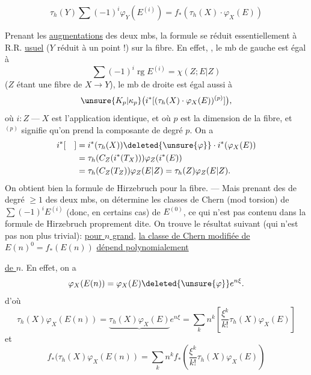 
\[
\boxed{\tau_h(Y)\sum(-1)^i\varphi_Y(E^{(i)})=f_*(\tau_h(X)\cdot\varphi_X(E))}\tag{1ter}
\]

Prenant les \uline{augmentations} des deux mbs, la formule se réduit essentiellement à R.R. \uline{usuel} (\(Y\) réduit à un point !) sur la fibre. En effet, , le mb de gauche est égal à
\[
\sum(-1)^i\operatorname{rg} E^{(i)}=\chi(Z;E|Z)
\]
(\(Z\) étant une fibre de \(X\to Y\)), le mb de droite est égal aussi à
\[
\unsure{K_p|\kappa_p}\bigl(i^*[(\tau_h(X)\cdot\varphi_X(E))^{(p)}]\bigr),
\]
où \(i:Z\mathbin{\text{---}}X\) est l'application identique, et où \(p\) est la dimension de la fibre, et \({}^{(p)}\) signifie qu'on prend la composante de degré \(p\). On a
\[
\begin{aligned}
i^*[\quad]&=i^*(\tau_h(X))\deleted{\unsure{\varphi}}\cdot i^*(\varphi_X(E))\\
&=\tau_h(C_Z(i^*(T_X)))\varphi_Z(i^*(E))\\
&=\tau_h(C_Z(T_Z))\varphi_Z(E|Z)=\tau_h(Z)\varphi_Z(E|Z).
\end{aligned}
\]
On obtient bien  la formule de Hirzebruch pour la fibre. --- Mais prenant des  de degré \(\geq1\) des deux mbs, on détermine les classes de Chern (mod torsion) de \(\sum(-1)^iE^{(i)}\) (donc, en certains cas) de \(E^{(0)}\), ce qui n'est pas contenu dans la formule de Hirzebruch proprement dite. On trouve  le résultat suivant (qui n'est pas non plus trivial): \uline{pour \(n\) grand}, \uline{la classe de Chern modifiée de} \(E(n)^0=f_*(E(n))\) \uline{dépend polynomialement}


\uline{de \(n\)}. En effet, on a
\[
\varphi_X(E(n))=\varphi_X(E)\deleted{\unsure{\varphi}}e^{n\xi}.
\]
d'où
\[
\tau_h(X)\varphi_X(E(n))=\underbrace{\tau_h(X)\varphi_X(E)}e^{n\xi}=\sum_k n^k\left[\frac{\xi^k}{k!}\tau_h(X)\varphi_X(E)\right]
\]
et
\[
f_*(\tau_h(X)\varphi_X(E(n))=\sum_k n^k f_*\left(\frac{\xi^k}{k!}\tau_h(X)\varphi_X(E)\right)
\]

